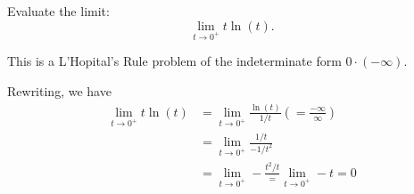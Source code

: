\documentclass{ximera}
\author{Emma Smith Zbarsky}
\begin{document}
\begin{exercise}

Evaluate the limit: \[\lim_{t \to 0^+} t\ln(t).\]


\begin{hint}
This is a L'Hopital's Rule problem of the indeterminate form
$0\cdot (-\infty)$.
\end{hint}


\begin{hint}
Rewriting, we have \begin{align*}
\lim_{t\to 0^+} t\ln(t) &= \lim_{t\to 0^+} \frac{\ln(t)}{1/t} \left(=\frac{-\infty}{\infty}\right) \\
&= \lim_{t\to 0^+} \frac{1/t}{-1/t^2} \\
&= \lim_{t\to 0^+} -\frac{t^2/t} = \lim_{t\to 0^+} -t = 0
\end{align*}
\end{hint}


\begin{multipleChoice}
\choice{$\infty$}
\choice{$-\infty$}
\end{multipleChoice}

\end{exercise}
\end{document}
